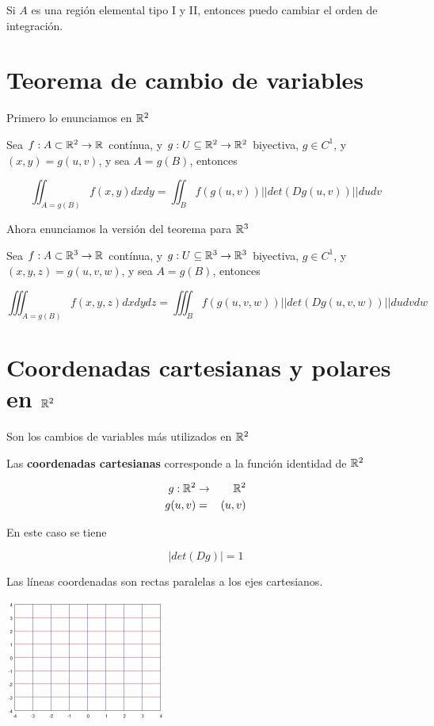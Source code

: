 \begin{observation}
Si $A$ es una región elemental tipo I y II, entonces puedo cambiar el orden de integración.
\end{observation}

\section{Teorema de cambio de variables}

Primero lo enunciamos en $\mathbb{R}^2$

\begin{theorem} 
Sea $f : A \subset \mathbb{R}^2 \to \mathbb{R}$ contínua, y $g : U \subseteq \mathbb{R}^2 \to \mathbb{R}^2$ biyectiva, $g \in C^1$, y $(x,y) = g(u,v)$, y sea $ A = g(B)$, entonces

$$ \displaystyle \iint_{A=g(B)} f(x,y) dxdy = \iint_{B} f(g(u,v)) ||det(Dg(u,v))|| dudv $$
\end{theorem}

Ahora enunciamos la versión del teorema para $\mathbb{R}^3$

\begin{theorem}
Sea $f : A \subset \mathbb{R}^3 \to \mathbb{R}$ contínua, y $g : U \subseteq \mathbb{R}^3 \to \mathbb{R}^3$ biyectiva, $g \in C^1$, y $(x,y,z) = g(u,v,w)$, y sea $ A = g(B)$, entonces

$$ \displaystyle \iiint_{A=g(B)} f(x,y,z) dxdydz = \iiint_{B} f(g(u,v,w)) ||det(Dg(u,v,w))|| dudvdw $$

\end{theorem}

\section{Coordenadas cartesianas y polares en $\mathbb{R}^2$}

Son los cambios de variables más utilizados en $\mathbb{R}^2$

\begin{definition}[Cartesianas]
Las \textbf{coordenadas cartesianas} corresponde a la función identidad de $\mathbb{R}^2$

\begin{eqnarray*} g: \mathbb{R}^2 &\to& \mathbb{R}^2 \\
 g(u,v) &=& (u,v) \end{eqnarray*}

En este caso se tiene

$$ |det(Dg)| = 1 $$

Las líneas coordenadas son rectas paralelas a los ejes cartesianos.

\begin{center}
\includegraphics{images/04_analisis2/coord_cart2d.png}
\end{center}
\end{definition}

